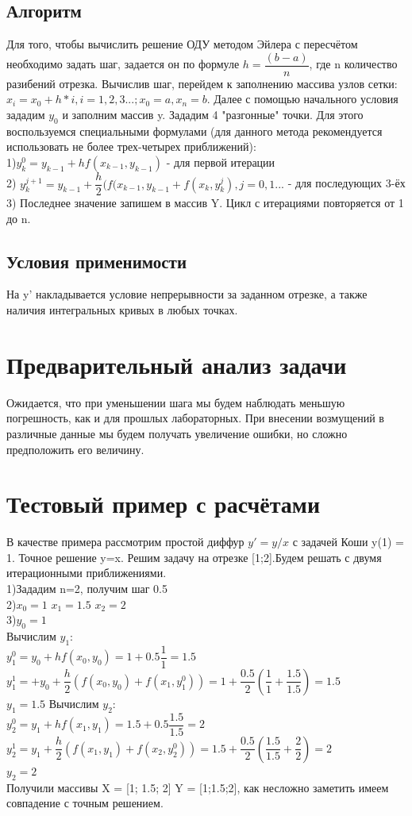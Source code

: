 \documentclass[a4paper]{article}
\begin{document}
\subsection{Алгоритм}
Для того, чтобы вычислить решение ОДУ методом Эйлера с пересчётом необходимо задать шаг, задается он по формуле $h=\dfrac{(b-a)}{n}$, где n количество разибений отрезка. Вычислив шаг, перейдем к заполнению массива узлов сетки: $x_i =x_0+h*i, i=1,2,3...; x_0=a, x_n=b$.
Далее с помощью начального условия зададим $y_0$ и заполним массив y. Зададим 4 "разгонные" точки. Для этого воспользуемся специальными формулами (для данного метода рекомендуется использовать не более трех-четырех приближений):\\
1)$y_k^0=y_{k-1}+hf(x_{k-1},y_{k-1})$ - для первой итерации\\
2) $y_k^{j+1}=y_{k-1}+\dfrac{h}{2}(f(x_{k-1},y_{k-1}+f(x_{k},y_{k}^{j}), j=0,1...$ - для последующих 3-ёх
3) Последнее значение запишем в массив Y. Цикл с итерациями повторяется от 1 до n. 

\subsection{Условия применимости}
На y' накладывается условие непрерывности за заданном отрезке, а также наличия интегральных кривых в любых точках.

 
\section{Предварительный анализ задачи} 
Ожидается, что при уменьшении шага мы будем наблюдать меньшую погрешность, как и для прошлых лабораторных. При внесении возмущений в различные данные мы будем получать увеличение ошибки, но сложно предположить его величину. 
\section{Тестовый пример с расчётами} 
В качестве примера рассмотрим простой диффур $y'=y/x$ с задачей Коши y(1) = 1. Точное решение y=x. Решим задачу на отрезке [1;2].Будем решать с двумя итерационными приближениями.\\
1)Зададим n=2, получим шаг 0.5\\
2)$x_0= 1$ $x_1=1.5$  $x_2=2$\\
3)$y_0=1$\\
Вычислим $y_1$:\\
$y_1^0=y_0+hf(x_0,y_0)=1+0.5\dfrac{1}{1}=1.5$\\
$y_1^1=+y_0+\dfrac{h}{2}(f(x_0,y_0)+f(x_1,y_1^0))=1+\dfrac{0.5}{2}(\dfrac{1}{1}+\dfrac{1.5}{1.5})=1.5$\\
$y_1=1.5$
Вычислим $y_2$:\\
$y_2^0=y_1+hf(x_1,y_1)=1.5+0.5\dfrac{1.5}{1.5}=2$\\
$y_2^1=y_1+\dfrac{h}{2}(f(x_1,y_1)+f(x_2,y_2^0))=1.5+\dfrac{0.5}{2}(\dfrac{1.5}{1.5}+\dfrac{2}{2})=2$\\
$y_2=2$ \\
Получили массивы X = [1; 1.5; 2] Y = [1;1.5;2], как несложно заметить имеем совпадение с точным решением.
\end{document}
